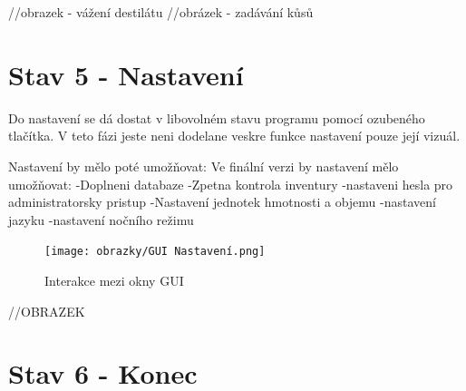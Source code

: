



//obrazek - vážení destilátu
//obrázek - zadávání kůsů


\section{Stav 5 - Nastavení}
Do nastavení se dá dostat v libovolném stavu programu pomocí ozubeného tlačítka. V teto fázi jeste neni dodelane veskre funkce nastavení pouze její vizuál.

Nastavení by mělo poté umožňovat:
Ve finální verzi by nastavení mělo umožňovat:
-Doplneni databaze
-Zpetna kontrola inventury
-nastaveni hesla pro administratorsky pristup
-Nastavení jednotek hmotnosti a objemu
-nastavení jazyku
-nastavení nočního režimu

\begin{figure}[H]
    \begin{center}
        \texttt{[image: obrazky/GUI Nastavení.png]}
    \end{center}
    \caption{Interakce mezi okny GUI}
    \label{Interakce mezi okny GUI}
\end{figure}

//OBRAZEK

\section{Stav 6 - Konec}


